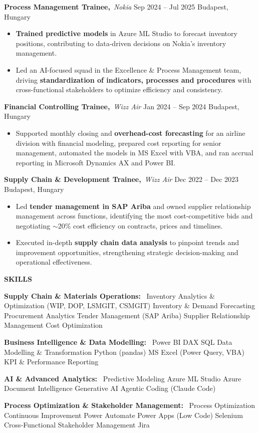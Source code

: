 \documentclass[10pt,a4paper]{article}
\newcommand{\cvsection}[2]{%
  \needspace{2\baselineskip}%
  \vspace{2pt}%
  {\color{accent}\large\bfseries #1\hspace{6pt}#2}\par
  \vspace{-5pt}{\color{accent}\rule{\linewidth}{0.9pt}}\par
  \vspace{2pt}%
}
\newcommand{\cventry}[4]{%
  \needspace{3\baselineskip}%
  {\parfillskip=0pt\relax
   \textbf{#1,}\ {\itshape\color{accent}#2}\hfill
   {\color{dim}#3 \textbar{} #4}\par}%
  \vspace{1pt}%
}
\newenvironment{cvbullets}{%
  \begin{itemize}[leftmargin=1.35em,itemsep=1pt,parsep=0pt,topsep=1pt,%
                  label={\color{accent}\small\textbullet}]
}{%
  \end{itemize}%
}
\newcommand{\skillgroup}[2]{%
  \textbf{#1:}~ #2\par\vspace{1.5pt}%
}
\begin{document}
\cventry{Process Management Trainee}{Nokia}{Sep 2024 -- Jul 2025}{Budapest, Hungary}
\begin{cvbullets}
  \item \textbf{Trained predictive models} in Azure ML Studio to forecast inventory positions, contributing to data-driven decisions on Nokia's inventory management.
  \item Led an AI-focused squad in the Excellence \& Process Management team, driving \textbf{standardization of indicators, processes and procedures} with cross-functional stakeholders to optimize efficiency and consistency.
\end{cvbullets}
\vspace{1pt}

\cventry{Financial Controlling Trainee}{Wizz Air}{Jan 2024 -- Sep 2024}{Budapest, Hungary}
\begin{cvbullets}
  \item Supported monthly closing and \textbf{overhead-cost forecasting} for an airline division with financial modeling, prepared cost reporting for senior management, automated the models in MS Excel with VBA, and ran accrual reporting in Microsoft Dynamics AX and Power BI.
\end{cvbullets}
\vspace{1pt}

\cventry{Supply Chain \& Development Trainee}{Wizz Air}{Dec 2022 -- Dec 2023}{Budapest, Hungary}
\begin{cvbullets}
  \item Led \textbf{tender management in SAP Ariba} and owned supplier relationship management across functions, identifying the most cost-competitive bids and negotiating $\sim$20\% cost efficiency on contracts, prices and timelines.
  \item Executed in-depth \textbf{supply chain data analysis} to pinpoint trends and improvement opportunities, strengthening strategic decision-making and operational effectiveness.
\end{cvbullets}

\cvsection{\faTools}{SKILLS}
\skillgroup{Supply Chain \& Materials Operations}{Inventory Analytics \& Optimization (WIP, DOP, LSMGIT, CSMGIT) \textbar{} Inventory \& Demand Forecasting \textbar{} Procurement Analytics \textbar{} Tender Management (SAP Ariba) \textbar{} Supplier Relationship Management \textbar{} Cost Optimization}
\skillgroup{Business Intelligence \& Data Modelling}{Power BI \textbar{} DAX \textbar{} SQL \textbar{} Data Modelling \& Transformation \textbar{} Python (pandas) \textbar{} MS Excel (Power Query, VBA) \textbar{} KPI \& Performance Reporting}
\skillgroup{AI \& Advanced Analytics}{Predictive Modeling \textbar{} Azure ML Studio \textbar{} Azure Document Intelligence \textbar{} Generative AI \textbar{} Agentic Coding (Claude Code)}
\skillgroup{Process Optimization \& Stakeholder Management}{Process Optimization \textbar{} Continuous Improvement \textbar{} Power Automate \textbar{} Power Apps (Low Code) \textbar{} Selenium \textbar{} Cross-Functional Stakeholder Management \textbar{} Jira}
\end{document}
